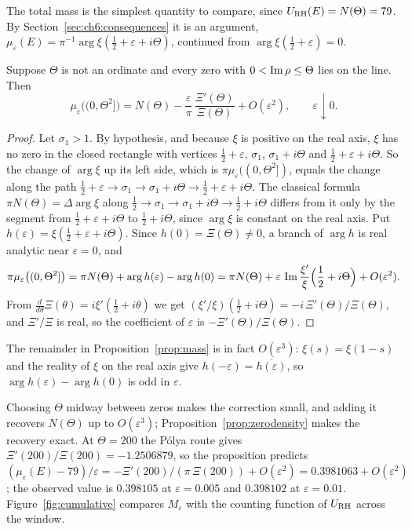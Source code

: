 The total mass is the simplest quantity to compare, since $U_{\mathrm{RH}}(E)=N(\Theta)=79$. By Section~\ref{sec:ch6:consequences} it is an argument, $\mu_\varepsilon(E)=\pi^{-1}\arg\xi(\tfrac12+\varepsilon+i\Theta)$, continued from $\arg\xi(\tfrac12+\varepsilon)=0$.

\begin{proposition}\label{prop:mass}
Suppose $\Theta$ is not an ordinate and every zero with $0<\operatorname{Im}\rho\le\Theta$ lies on the line. Then
\[
\mu_\varepsilon\big((0,\Theta^2]\big)=N(\Theta)-\frac{\varepsilon}{\pi}\,\frac{\Xi'(\Theta)}{\Xi(\Theta)}+O(\varepsilon^2),\qquad \varepsilon\downarrow0.
\]
\end{proposition}

\begin{proof}
Let $\sigma_1>1$. By hypothesis, and because $\xi$ is positive on the real axis, $\xi$ has no zero in the closed rectangle with vertices $\tfrac12+\varepsilon$, $\sigma_1$, $\sigma_1+i\Theta$ and $\tfrac12+\varepsilon+i\Theta$. So the change of $\arg\xi$ up its left side, which is $\pi\mu_\varepsilon((0,\Theta^2])$, equals the change along the path $\tfrac12+\varepsilon\to\sigma_1\to\sigma_1+i\Theta\to\tfrac12+\varepsilon+i\Theta$. The classical formula $\pi N(\Theta)=\Delta\arg\xi$ along $\tfrac12\to\sigma_1\to\sigma_1+i\Theta\to\tfrac12+i\Theta$ \cite[Section 9.3]{Titchmarsh} differs from it only by the segment from $\tfrac12+\varepsilon+i\Theta$ to $\tfrac12+i\Theta$, since $\arg\xi$ is constant on the real axis. Put $h(\varepsilon)=\xi(\tfrac12+\varepsilon+i\Theta)$. Since $h(0)=\Xi(\Theta)\ne0$, a branch of $\arg h$ is real analytic near $\varepsilon=0$, and
\[
\pi\mu_\varepsilon\big((0,\Theta^2]\big)=\pi N(\Theta)+\arg h(\varepsilon)-\arg h(0)=\pi N(\Theta)+\varepsilon\,\operatorname{Im}\frac{\xi'}{\xi}\Big(\frac12+i\Theta\Big)+O(\varepsilon^2).
\]
From $\frac{d}{d\theta}\Xi(\theta)=i\xi'(\tfrac12+i\theta)$ we get $(\xi'/\xi)(\tfrac12+i\Theta)=-i\,\Xi'(\Theta)/\Xi(\Theta)$, and $\Xi'/\Xi$ is real, so the coefficient of $\varepsilon$ is $-\Xi'(\Theta)/\Xi(\Theta)$.
\end{proof}

\begin{remark}\label{rem:ch7:cubic}
The remainder in Proposition~\ref{prop:mass} is in fact $O(\varepsilon^3)$: $\xi(s)=\xi(1-s)$ and the reality of $\xi$ on the real axis give $h(-\varepsilon)=\overline{h(\varepsilon)}$, so $\arg h(\varepsilon)-\arg h(0)$ is odd in $\varepsilon$.
\end{remark}

Choosing $\Theta$ midway between zeros makes the correction small, and adding it recovers $N(\Theta)$ up to $O(\varepsilon^3)$; Proposition~\ref{prop:zerodensity} makes the recovery exact. At $\Theta=200$ the P\'olya route gives $\Xi'(200)/\Xi(200)=-1.2506879$, so the proposition predicts $(\mu_\varepsilon(E)-79)/\varepsilon=-\Xi'(200)/(\pi\,\Xi(200))+O(\varepsilon^2)=0.3981063+O(\varepsilon^2)$; the observed value is $0.398105$ at $\varepsilon=0.005$ and $0.398102$ at $\varepsilon=0.01$. Figure~\ref{fig:cumulative} compares $M_\varepsilon$ with the counting function of $U_{\mathrm{RH}}$ across the window.

